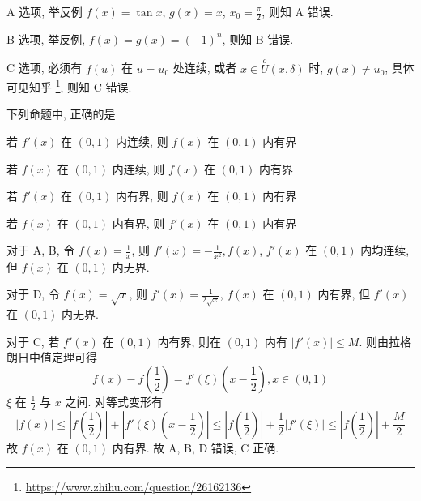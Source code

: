 \begin{analysis}
  A 选项,
  举反例 $f(x) = \tan x$, $g(x) = x$, $x_0 = \frac{\pi}{2}$,
  则知 A 错误.

  B 选项,
  举反例, $f(x) = g(x) = (-1)^n$,
  则知 B 错误.

  C 选项,
  必须有 $f(u)$ 在 $u = u_0$ 处连续,
  或者 $x \in \stackrel{o}{U} \left(x, \delta\right)$ 时, $g(x) \neq u_0$,
  具体可见知乎 \footnote{\url{https://www.zhihu.com/question/26162136}},
  则知 C 错误.
\end{analysis}

\begin{question}
  下列命题中,
  正确的是
  \paren[C]
  \begin{choices}
    \item 若 $f'(x)$ 在 $(0,1)$ 内连续,
    则 $f(x)$ 在 $(0,1)$ 内有界
    \item 若 $f(x)$ 在 $(0,1)$ 内连续,
    则 $f(x)$ 在 $(0,1)$ 内有界
    \item 若 $f'(x)$ 在 $(0,1)$ 内有界,
    则 $f(x)$ 在 $(0,1)$ 内有界
    \item 若 $f(x)$ 在 $(0,1)$ 内有界,
    则 $f'(x)$ 在 $(0,1)$ 内有界
  \end{choices}
\end{question}

\begin{analysis}
  对于 A, B,
  令 $f(x) = \frac{1}{x}$,
  则 $f'(x) = -\frac{1}{x^2}, f(x)$,
  $f'(x) $ 在 $\left( 0,1 \right) $ 内均连续,
  但 $f(x) $ 在 $\left( 0,1 \right) $ 内无界.

  对于 D,
  令 $f(x) = \sqrt{x}$,
  则 $f'(x) = \frac{1}{2\sqrt{x}}$,
  $f(x) $ 在 $\left( 0,1 \right) $ 内有界,
  但 $f'(x) $ 在 $\left( 0,1 \right) $ 内无界.

  对于 C,
  若 $f'(x) $ 在 $\left( 0,1 \right) $ 内有界,
  则在 $\left(0,1 \right) $ 内有 $\left| f'(x) \right|\leqslant M $.
  则由拉格朗日中值定理可得
  \[
    f(x) -f\left( \frac{1}{2} \right) = f'\left( \xi \right) \left( x-\frac{1}{2} \right) , x\in \left( 0,1 \right)
  \]
  $\xi $ 在 $\frac{1}{2}$ 与 $x$ 之间.
  对等式变形有
  \[
    \left| f(x) \right|\leqslant \left| f\left( \frac{1}{2} \right) \right|+\left| f'\left( \xi \right) \left( x-\frac{1}{2} \right) \right|\leqslant \left| f\left( \frac{1}{2} \right) \right|+\frac{1}{2}\left| f'\left( \xi \right) \right|\leqslant \left| f\left( \frac{1}{2} \right) \right|+\frac{M}{2}
  \]
  故 $f(x) $ 在 $\left( 0,1 \right) $ 内有界.
  故 A, B, D 错误, C 正确.
\end{analysis}

